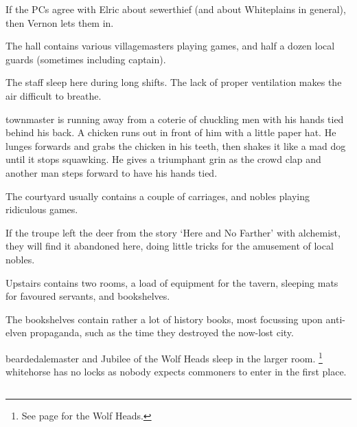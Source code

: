 \begin{multicols}{2}
If the PCs agree with Elric about \gls{sewerthief} (and about Whiteplains in general), then Vernon lets them in.


The hall contains various villagemasters playing games, and half a dozen local guards (sometimes including \gls{captain}).



The staff sleep here during long shifts.  The lack of proper ventilation makes the air difficult to breathe.


\begin{boxtext}

  \Gls{townmaster} is running away from a coterie of chuckling men with his hands tied behind his back.
   A chicken runs out in front of him with a little paper hat.
   He lunges forwards and grabs the chicken in his teeth, then shakes it like a mad dog until it stops squawking.
   He gives a triumphant grin as the crowd clap and another man steps forward to have his hands tied.

\end{boxtext}

The courtyard usually contains a couple of carriages, and nobles playing ridiculous games.

If the troupe left the deer from the story `Here and No Farther' with \gls{alchemist}, they will find it abandoned here, doing little tricks for the amusement of local nobles.


Upstairs contains two rooms, a load of equipment for the tavern, sleeping mats for favoured servants, and bookshelves.

The bookshelves contain rather a lot of history books, most focussing upon anti-elven propaganda, such as the time they destroyed the now-lost city.

\Gls{beardedalemaster} and Jubilee of the Wolf Heads sleep in the larger room.%
\footnote{See page \pageref{wolfHeads} for the Wolf Heads.}
\Gls{whitehorse} has no locks as nobody expects commoners to enter in the first place.
 

\subsection{}


\end{multicols}
